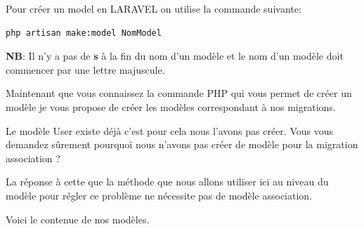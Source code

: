 \documentclass[12pt,a4paper]{article}
\begin{document}
Pour créer un model en LARAVEL on utilise la commande suivante:\\

\begin{verbatim}
php artisan make:model NomModel
\end{verbatim}

\textbf{NB}: Il n'y a pas de \textbf{s} à la fin du nom d'un modèle et le nom d'un modèle doit commencer par une lettre majuscule.

Maintenant que vous connaissez la commande PHP qui vous permet de créer un modèle je vous
propose de créer les modèles correspondant à nos migrations.\par

Le modèle User existe déjà c'est pour cela nous l'avons pas créer.
Vous vous demandez sûrement pourquoi nous n'avons pas créer de modèle pour la migration association ?\par

La réponse à cette que la méthode que nous allons utiliser ici au niveau du modèle pour régler ce problème ne nécessite pas de modèle association.

Voici le contenue de nos modèles.\\
\end{document}
